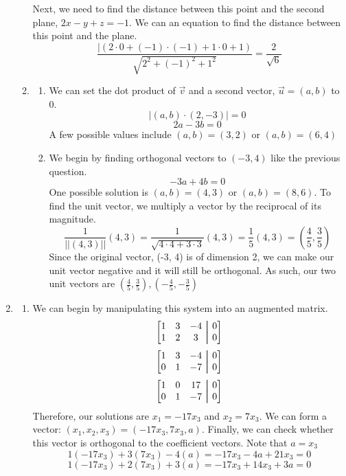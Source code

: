 \documentclass[11pt, letterpaper, twoside]{article}
\newcommand\aug{\fboxsep=-\fboxrule\!\!\!\fbox{\strut}\!\!\!} %
\begin{document}
\begin{enumerate}
\begin{enumerate}[label=\alph*)]
Next, we need to find the distance between this point and the second plane, \(2x-y+z=-1\).
We can an equation to find the distance between this point and the plane.
\[\frac{|(2\cdot0+(-1)\cdot(-1)+1\cdot0+1)}{\sqrt{2^2+(-1)^2+1^2}}=\boxed{\frac{2}{\sqrt{6}}}\]
\item \begin{enumerate}[label=\roman*)]
Two vectors are orthogonal if \(|a\cdot b|=0\).
\[|a\cdot b|=-ab+ab=0\]
Therefore, these two vectors are orthogonal.
\item We can set the dot product of \(\vec v\) and a second vector, \(\vec{u}=(a,b)\) to 0.
\[|(a,b)\cdot(2,-3)|=0\]
\[2a-3b=0\]
A few possible values include \((a,b)=(3,2)\) or \((a,b)=(6,4)\)
\item We begin by finding orthogonal vectors to \((-3,4)\) like the previous question.
\[-3a+4b=0\]
One possible solution is \((a,b)=(4,3)\) or \((a,b)=(8,6)\).
To find the unit vector, we multiply a vector by the reciprocal of its magnitude.
\[\frac{1}{||(4,3)||}(4,3)=\frac{1}{\sqrt{4\cdot4+3\cdot3}}(4,3)=\frac{1}{5}(4,3)=\left(\frac{4}{5},\frac{3}{5}\right)\]
Since the original vector, (-3, 4) is of dimension 2, we can make our unit vector negative and it will still be orthogonal. 
As such, our two unit vectors are \(\boxed{\left(\frac{4}{5}, \frac{3}{5}\right), \left(-\frac{4}{5}, -\frac{3}{5}\right)}\)
\end{enumerate}
\end{enumerate} 
\item 
\begin{enumerate}[label=\alph*)]
\item 
We can begin by manipulating this system into an augmented matrix.
\[\begin{bmatrix}
1&3&-4&\aug&0\\
1&2&3&\aug&0
\end{bmatrix}\]
\[\begin{bmatrix}
1&3&-4&\aug&0\\
0&1&-7&\aug&0
\end{bmatrix}\]
\[\begin{bmatrix}
1&0&17&\aug&0\\
0&1&-7&\aug&0
\end{bmatrix}\]
Therefore, our solutions are \(x_1=-17x_3\) and \(x_2=7x_3\). We can form a vector: \((x_1, x_2, x_3)=(-17x_3, 7x_3, a)\). 
Finally, we can check whether this vector is orthogonal to the coefficient vectors. Note that \(a=x_3\)
\[1(-17x_3)+3(7x_3)-4(a)=-17x_3-4a+21x_3=0\]
\[1(-17x_3)+2(7x_3)+3(a)=-17x_3+14x_3+3a=0\]

\end{enumerate}
\end{enumerate}
\end{document}
